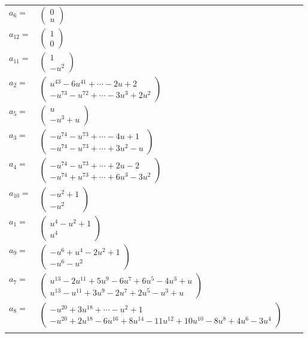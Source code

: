 \documentclass[1p]{elsarticle_modified}
\theoremstyle{definition}
\begin{document}
\begin{tabular}{m{7pt} m{180pt} m{7pt} m{180pt} }
\flushright $a_{6}=$&$\begin{pmatrix}0\\u\end{pmatrix}$ \\
\flushright $a_{12}=$&$\begin{pmatrix}1\\0\end{pmatrix}$ \\
\flushright $a_{11}=$&$\begin{pmatrix}1\\- u^2\end{pmatrix}$ \\
\flushright $a_{2}=$&$\begin{pmatrix}u^{43}-6 u^{41}+\cdots-2 u+2\\- u^{73}- u^{72}+\cdots-3 u^3+2 u^2\end{pmatrix}$ \\
\flushright $a_{5}=$&$\begin{pmatrix}u\\- u^3+u\end{pmatrix}$ \\
\flushright $a_{3}=$&$\begin{pmatrix}- u^{74}- u^{73}+\cdots-4 u+1\\- u^{74}- u^{73}+\cdots+3 u^2- u\end{pmatrix}$ \\
\flushright $a_{4}=$&$\begin{pmatrix}- u^{74}- u^{73}+\cdots+2 u-2\\- u^{74}+u^{73}+\cdots+6 u^3-3 u^2\end{pmatrix}$ \\
\flushright $a_{10}=$&$\begin{pmatrix}- u^2+1\\- u^2\end{pmatrix}$ \\
\flushright $a_{1}=$&$\begin{pmatrix}u^4- u^2+1\\u^4\end{pmatrix}$ \\
\flushright $a_{9}=$&$\begin{pmatrix}- u^6+u^4-2 u^2+1\\- u^6- u^2\end{pmatrix}$ \\
\flushright $a_{7}=$&$\begin{pmatrix}u^{13}-2 u^{11}+5 u^9-6 u^7+6 u^5-4 u^3+u\\u^{13}- u^{11}+3 u^9-2 u^7+2 u^5- u^3+u\end{pmatrix}$ \\
\flushright $a_{8}=$&$\begin{pmatrix}- u^{20}+3 u^{18}+\cdots- u^2+1\\- u^{20}+2 u^{18}-6 u^{16}+8 u^{14}-11 u^{12}+10 u^{10}-8 u^8+4 u^6-3 u^4\end{pmatrix}$\\&\end{tabular}
\end{document}

